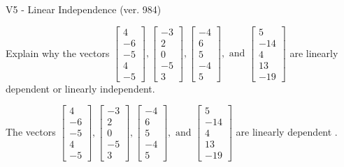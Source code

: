 \begin{exercise}
  \begin{exerciseTitle}V5 - Linear Independence (ver. 984)\end{exerciseTitle}
  \begin{exerciseStatement}
    Explain why the vectors \(\left[\begin{array}{r}
4 \\
-6 \\
-5 \\
4 \\
-5
\end{array}\right] , \left[\begin{array}{r}
-3 \\
2 \\
0 \\
-5 \\
3
\end{array}\right] , \left[\begin{array}{r}
-4 \\
6 \\
5 \\
-4 \\
5
\end{array}\right] , \text{ and } \left[\begin{array}{r}
5 \\
-14 \\
4 \\
13 \\
-19
\end{array}\right]\) are linearly dependent or linearly independent.	


  \end{exerciseStatement}
  \begin{exerciseAnswer}
   The vectors \(\left[\begin{array}{r}
4 \\
-6 \\
-5 \\
4 \\
-5
\end{array}\right] , \left[\begin{array}{r}
-3 \\
2 \\
0 \\
-5 \\
3
\end{array}\right] , \left[\begin{array}{r}
-4 \\
6 \\
5 \\
-4 \\
5
\end{array}\right] , \text{ and } \left[\begin{array}{r}
5 \\
-14 \\
4 \\
13 \\
-19
\end{array}\right]\) are 
  	 linearly dependent  .
  


  \end{exerciseAnswer}
\end{exercise}
